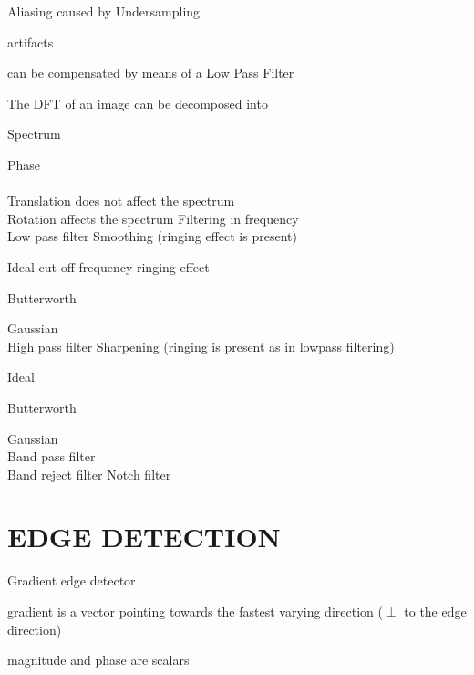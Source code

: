 \documentclass[11pt,english]{article}
\begin{document}
Aliasing caused by Undersampling \par
    \makebox[1.5cm]{\textrightarrow} artifacts\par
    \makebox[1.5cm]{\textrightarrow} {\textrightarrow} can be compensated by means of a Low Pass Filter\par

The DFT of an image can be decomposed into \par
    \makebox[1.5cm]{\textrightarrow} Spectrum\par
    \makebox[1.5cm]{\textrightarrow} Phase \\
\\
Translation \makebox[0.5cm]{\textrightarrow} does not affect the spectrum \\
Rotation \makebox[0.5cm]{\textrightarrow} affects the spectrum
\medskip
Filtering in frequency \\
Low pass filter  \makebox[0.5cm]{\textrightarrow} Smoothing (ringing effect is present) \par
    \makebox[1.5cm]{\textrightarrow} Ideal \makebox[0.5cm]{\textrightarrow} cut-off frequency  \makebox[0.5cm]{\textrightarrow} ringing effect\par
    \makebox[1.5cm]{\textrightarrow} Butterworth\par
    \makebox[1.5cm]{\textrightarrow} Gaussian \\
%
High pass filter \makebox[0.5cm]{\textrightarrow} Sharpening (ringing is present as in lowpass filtering) \par
    \makebox[1.5cm]{\textrightarrow} Ideal\par
    \makebox[1.5cm]{\textrightarrow} Butterworth\par
    \makebox[1.5cm]{\textrightarrow} Gaussian \\
Band pass filter \\
Band reject filter \makebox[0.5cm]{\textrightarrow} Notch filter

\section{EDGE DETECTION}

Gradient edge detector \par
    \makebox[1.5cm]{\textrightarrow} gradient is a vector pointing towards the fastest varying direction ($\perp$ to the edge direction)\par
    \makebox[1.5cm]{\textrightarrow} magnitude and phase are scalars\par
\end{document}
